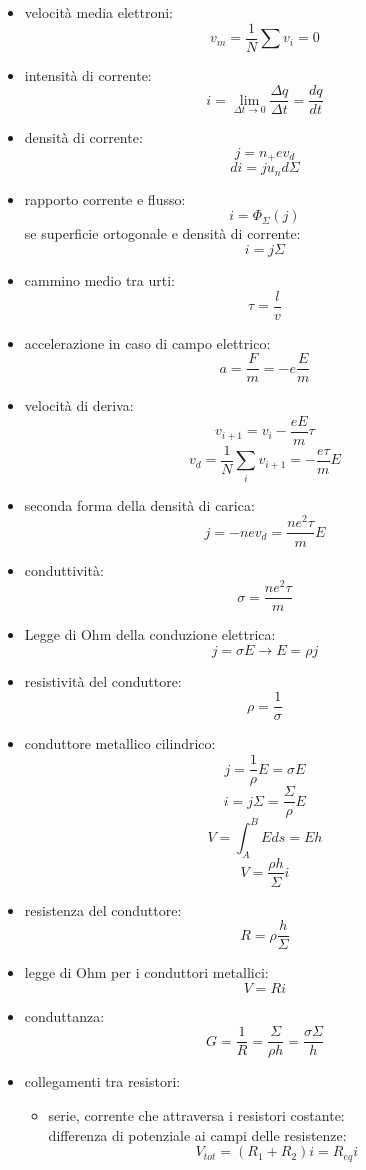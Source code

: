 \documentclass[a4paper,12pt, oneside]{book}
\begin{document}
\begin{itemize}
\begin{itemize}
	      \end{itemize}
	\item velocità media elettroni:
	      $$v_m=\frac{1}{N}\sum v_i=0$$
	\item intensità di corrente:
	      $$i=\lim_{\Delta t\to 0}\frac{\Delta q}{\Delta t}=\frac{dq}{dt}$$
	\item densità di corrente:
	      $$j=n_+ev_d$$
	      $$di=ju_nd\Sigma$$
	\item rapporto corrente e flusso:
	      $$i=\Phi_\Sigma(j)$$
	      se superficie ortogonale e densità di corrente:
	      $$i=j\Sigma$$
	\item cammino medio tra urti:
	      $$\tau=\frac{l}{v}$$
	\item accelerazione in caso di campo elettrico:
	      $$a=\frac{F}{m}=-e\frac{E}{m}$$
	\item velocità di deriva:
	      $$v_{i+1}=v_i-\frac{eE}{m}\tau$$
	      $$v_d=\frac{1}{N}\sum_i v_{i+1}=-\frac{e\tau}{m}E$$
	\item seconda forma della densità di carica:
	      $$j=-nev_d=\frac{ne^2\tau}{m}E$$
	\item conduttività:
	      $$\sigma=\frac{ne^2\tau}{m}$$
	\item Legge di Ohm della conduzione elettrica:
	      $$j=\sigma E\to E=\rho j$$
	\item resistività del conduttore:
	      $$\rho =\frac{1}{\sigma}$$
	\item conduttore metallico cilindrico:
	      $$j=\frac{1}{\rho}E=\sigma E$$
	      $$i=j\Sigma=\frac{\Sigma}{\rho}E$$
	      $$V=\int_A^BEds=Eh$$
	      $$V=\frac{\rho h}{\Sigma}i$$
	\item resistenza  del conduttore:
	      $$R=\rho\frac{h}{\Sigma}$$
	\item legge di Ohm per i conduttori metallici:
	      $$V=Ri$$
	\item conduttanza:
	      $$G=\frac{1}{R}=\frac{\Sigma}{\rho h}=\frac{\sigma\Sigma}{h}$$
	\item collegamenti tra resistori:
	      \begin{itemize}
		      \item serie, corrente che attraversa i resistori costante:\\
		            differenza di potenziale ai campi delle resistenze:
		            $$V_{tot}=(R_1+R_2)i=R_{eq}i$$


\end{itemize}
\end{itemize}
\end{document}
